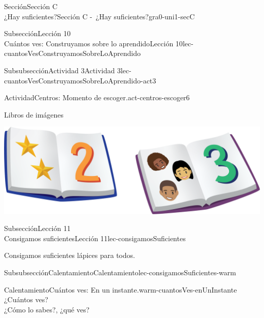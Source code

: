 \begin{sectionptx}{Sección}{{\Large Sección C\\}¿Hay suficientes?}{}{Sección C -~¿Hay suficientes?}{}{}{gra0-uni1-secC}
\begin{subsectionptx}{Subsección}{{\normalsize Lección 10\\[-0.05cm]}Cuántos ves: Construyamos sobre lo aprendido}{}{Lección 10}{}{}{lec-cuantosVesConstruyamosSobreLoAprendido}
\begin{subsubsectionptx}{Subsubsección}{Actividad 3}{}{Actividad 3}{}{}{lec-cuantosVesConstruyamosSobreLoAprendido-act3}
\begin{activity}{Actividad}{Centros: Momento de escoger.}{act-centros-escoger6}
\begin{sidebyside}{2}{0.025}{0.025}{0.05}
\begin{sbspanel}{0.45}%
Libros de imágenes%
\par
\includegraphics[max width=\linewidth, center]{external/png-source/K.1.D Beta Student Workbooks.Books.png}
\end{sbspanel}%
\end{sidebyside}%
\end{activity}%
\end{subsubsectionptx}
\end{subsectionptx}
%
%
\typeout{************************************************}
\typeout{************************************************}
%
\begin{subsectionptx}{Subsección}{{\normalsize Lección 11\\[-0.05cm]}Consigamos suficientes}{}{Lección 11}{}{}{lec-consigamosSuficientes}
\begin{introduction}{}%
Consigamos suficientes lápices para todos.%
\end{introduction}%
%
%
\typeout{************************************************}
\typeout{************************************************}
%
\begin{subsubsectionptx}{Subsubsección}{Calentamiento}{}{Calentamiento}{}{}{lec-consigamosSuficientes-warm}
\begin{exploration}{Calentamiento}{Cuántos ves: En un instante.}{warm-cuantosVes-enUnInstante}%
¿Cuántos ves?\\
 ¿Cómo lo sabes?, ¿qué ves?%
\begin{sidebyside}{2}{0}{0}{0}%
\begin{sbspanel}{0.5}%

\end{sbspanel}
\end{sidebyside}
\end{exploration}
\end{subsubsectionptx}
\end{subsectionptx}
\end{sectionptx}

